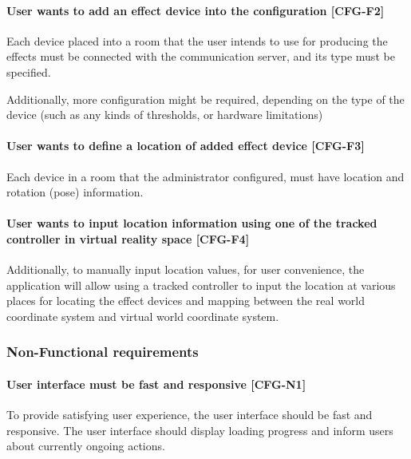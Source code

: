 \hypertarget{x-\textbf{user-wants-to-add-an-effect-device-into-the-configuration}-[cfg-f2]}{\paragraph*{\textbf{User wants to add an effect device into the configuration} [CFG-F2]}}
Each device placed into a room that the user intends to use for producing the effects
must be connected with the communication server, and its type must be specified.


Additionally, more configuration might be required, depending on the type
of the device (such as any kinds of thresholds, or hardware limitations)


\hypertarget{x-\textbf{user-wants-to-define-a-location-of-added-effect-device}-[cfg-f3]}{\paragraph*{\textbf{User wants to define a location of added effect device} [CFG-F3]}}
Each device in a room that the administrator configured,
must have location and rotation (pose) information.


\hypertarget{x-\textbf{user-wants-to-input-location-information-using-one-of-the-tracked-controller-in-virtual-reality-space}-[cfg-f4]}{\paragraph*{\textbf{User wants to input location information using one of the tracked controller in virtual reality space} [CFG-F4]}}
Additionally, to manually input location values, for user convenience,
the application will allow using a tracked controller to input the location at
various places for locating the effect
devices and mapping between the real world coordinate system and virtual
world coordinate system.


\hypertarget{x-non-functional-requirements}{\subsubsection*{Non-Functional requirements}}
\hypertarget{x-\textbf{user-interface-must-be-fast-and-responsive}-[cfg-n1]}{\paragraph*{\textbf{User interface must be fast and responsive} [CFG-N1]}}
To provide satisfying user experience, the user interface should be fast and
responsive. The user interface should display loading progress and inform users
about currently ongoing actions.


